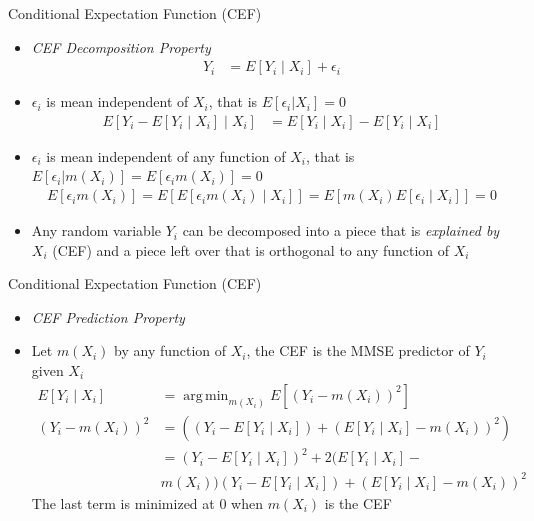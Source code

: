 \documentclass[aspectratio=1610,12pt,xcolor=dvipsnames]{beamer}
\DeclareMathOperator*{\argmin}{arg\,min}
\begin{document}
\begin{frame}{Conditional Expectation Function (CEF)}

\begin{itemize}
    \item \textit{CEF Decomposition Property}
        \begin{align*}
            Y_i &= E[Y_i \mid X_i] + \epsilon_i
        \end{align*}
    \item $\epsilon_i$ is mean independent of $X_i$, that is $E[\epsilon_i | X_i]=0$
        \begin{align*}
            E[Y_i - E[Y_i \mid X_i] \mid X_i] &= E[Y_i \mid X_i] - E[Y_i \mid X_i]
        \end{align*}
        \item $\epsilon_i$ is mean independent of any function of $X_i$, that is $E[\epsilon_i | m(X_i)]=E[\epsilon_im(X_i)]=0$
        \begin{align*}
            E[\epsilon_im(X_i)] = E[E[\epsilon_im(X_i) \mid X_i]] = E[m(X_i) E[\epsilon_i \mid X_i]] = 0
        \end{align*}
        \item Any random variable $Y_i$ can be decomposed into a piece that is \textit{explained by } $X_i$ (CEF) and a piece left over that is orthogonal to any function of $X_i$
\end{itemize}
\end{frame}

\begin{frame}{Conditional Expectation Function (CEF)}

\begin{itemize}
    \item \textit{CEF Prediction Property}
    \item Let $m(X_i)$ by any function of $X_i$, the CEF is the MMSE predictor of $Y_i$ given $X_i$
    \begin{align*}
        E[Y_i \mid X_i] &= \argmin_{m(X_i)} E[(Y_i - m(X_i))^2]
        \\ (Y_i - m(X_i))^2&= ((Y_i - E[Y_i \mid X_i]) + ( E[Y_i \mid X_i] -m(X_i))^2) \\
        &= (Y_i - E[Y_i \mid X_i])^2 + 2 ( E[Y_i \mid X_i] - \\
        & m(X_i)) (Y_i - E[Y_i \mid X_i]) + (E[Y_i \mid X_i] -m(X_i))^2
    \end{align*}
    The last term is minimized at 0 when $m(X_i)$ is the CEF
\end{itemize}
\end{frame}
\end{document}
